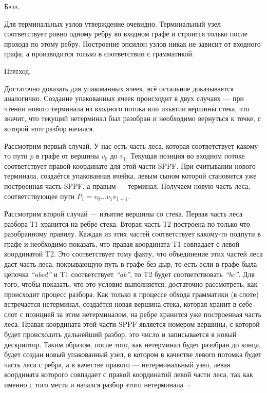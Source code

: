 \textsc{База.}

Для терминальных узлов утверждение очевидно. Терминальный узел соответствует ровно одному ребру во входном графе и строится только после прохода по этому ребру. Построение эпсилон узлов никак не зависит от входного графа, а производится только в соответствии с грамматикой. 

\textsc{Переход.}

Достаточно доказать для упакованных ячеек, всё остальное доказывается аналогично. Создание упакованных ячеек происходит в двух случаях --- при чтении нового терминала из входного потока или изъятии вершины стека, что значит, что текущий нетерминал был разобран и необходимо вернуться к точке, с которой этот разбор начался. 

Рассмотрим первый случай. У нас есть часть леса, которая соответствует какому-то пути $p$ в графе от вершины $v_0$ до $v_1$. Текущая позиция во входном потоке соответствует правой координате для этой части SPPF. При считывании нового терминала, создаётся упакованная ячейка, левым сыном которой становится уже построенная часть SPPF, а правым --- терминал. Получаем новую часть леса, соответствующее пути $P_1 = v_0 \dots v_1 v_{1+1}$.

Рассмотрим второй случай --- изъятие вершины со стека. Первая часть леса разбора Т1 хранится на ребре стека. Вторая часть Т2 построена по только что разобранному правилу. Каждая из этих частей соответствует какому-то подпути в графе и необходимо показать, что правая координата T1 совпадает с левой координатой T2. Это соответствует тому факту, что объединение этих частей леса даст часть леса, покрывающую путь в графе без дыр, то есть если в графе была цепочка {\it ``abcd''} и T1 соответствует {\it ``ab''}, то T2 будет соответствовать {\it ``bc''}. Для того, чтобы показать, что это условие выполняется, достаточно рассмотреть, как происходит процесс разбора. Как только в процессе обхода грамматики (в слоте) встречается нетерминал, создаётся новая вершина стека, которая хранит в себе слот с позицией за этим нетерминалом, на ребре хранится уже построенная часть леса. Правая координата этой части SPPF является номером вершины, с которой будет происходить дальнейший разбор, это число и записывается в новый дескриптор. Таким образом, после того, как нетерминал будет разобран до конца, будет создан новый упакованный узел, в котором в качестве левого потомка будет часть леса с ребра, а в качестве правого --- нетерминальный узел, левая координата которого совпадает с правой координатой левой части леса, так как именно с того места и начался разбор этого нетерминала. $\square$

